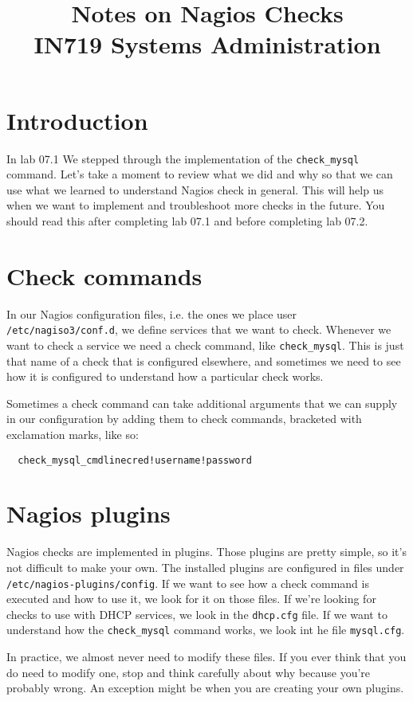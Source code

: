 \documentclass{article}         %
\title{Notes on Nagios Checks\\ IN719 Systems Administration}
\date{}                                                 %
\begin{document}
\maketitle

\section*{Introduction}
In lab 07.1 We stepped through the implementation of the \texttt{check\_mysql} command. Let's take a moment to review what we did and why so that we can use what we learned to understand Nagios check in general. This will help us when we want to implement and troubleshoot more checks in the future. You should read this after completing lab 07.1 and before completing lab 07.2.

\section{Check commands}
In our Nagios configuration files, i.e. the ones we place user \texttt{/etc/nagiso3/conf.d}, we define services that we want to check. Whenever we want to check a service we need a check command, like \texttt{check\_mysql}. This is just that name of a check that is configured elsewhere, and sometimes we need to see how it is configured to understand how a particular check works.

Sometimes a check command can take additional arguments that we can supply in our configuration by adding them to check commands, bracketed with exclamation marks, like so:

\begin{verbatim}
  check_mysql_cmdlinecred!username!password
\end{verbatim}

\section{Nagios plugins}
Nagios checks are implemented in plugins. Those plugins are pretty simple, so it's not difficult to make your own. The installed plugins are configured in files under \texttt{/etc/nagios-plugins/config}. If we want to see how a check command is executed and how to use it, we look for it on those files. If we're looking for checks to use with DHCP services, we look in the \texttt{dhcp.cfg} file. If we want to understand how the \texttt{check\_mysql} command works, we look int he file \texttt{mysql.cfg}.

In practice, we almost never need to modify these files. If you ever think that you do need to modify one, stop and think carefully about why because you're probably wrong. An exception might be when you are creating your own plugins.
\end{document}
